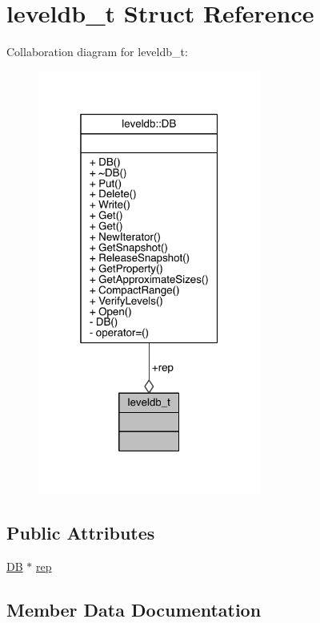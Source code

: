 \hypertarget{structleveldb__t}{}\section{leveldb\+\_\+t Struct Reference}
\label{structleveldb__t}


Collaboration diagram for leveldb\+\_\+t\+:\nopagebreak
\begin{figure}[H]
\begin{center}
\leavevmode
\includegraphics[width=208pt]{structleveldb__t__coll__graph}
\end{center}
\end{figure}
\subsection*{Public Attributes}
\begin{DoxyCompactItemize}
\item 
\hyperlink{classleveldb_1_1_d_b}{D\+B} $\ast$ \hyperlink{structleveldb__t_af8f1950b2c676ccc37e4095f558261ad}{rep}
\end{DoxyCompactItemize}


\subsection{Member Data Documentation}
\hypertarget{structleveldb__t_af8f1950b2c676ccc37e4095f558261ad}{}
